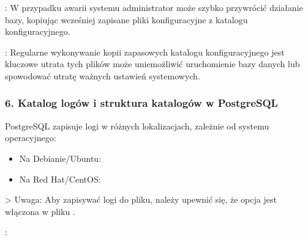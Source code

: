 \documentclass[letterpaper,10pt,polish]{sphinxmanual}
\begin{document}
\sphinxAtStartPar
{}: W przypadku awarii systemu administrator może szybko przywrócić działanie bazy, kopiując wcześniej zapisane pliki konfiguracyjne z katalogu konfiguracyjnego.

\sphinxAtStartPar
{}: Regularne wykonywanie kopii zapasowych katalogu konfiguracyjnego jest kluczowe \textendash{} utrata tych plików może uniemożliwić uruchomienie bazy danych lub spowodować utratę ważnych ustawień systemowych.


\subsubsection{6. Katalog logów i struktura katalogów w PostgreSQL}
\label{\detokenize{rozdzial2/Konfiguracja_baz_danych/Konfiguracja_baz_danych:katalog-logow-i-struktura-katalogow-w-postgresql}}
\sphinxAtStartPar
{}
PostgreSQL zapisuje logi w różnych lokalizacjach, zależnie od systemu operacyjnego:
\begin{itemize}
\item {} 
\sphinxAtStartPar
Na Debianie/Ubuntu: 

\item {} 
\sphinxAtStartPar
Na Red Hat/CentOS: 

\end{itemize}

\sphinxAtStartPar
\textgreater{} Uwaga: Aby zapisywać logi do pliku, należy upewnić się, że opcja  jest włączona w pliku .

\sphinxAtStartPar
{}:

\begin{sphinxVerbatim}[commandchars=\\\{\}]
         
       
       
      
       
    
  
  
      
    
\end{sphinxVerbatim}
\end{document}
